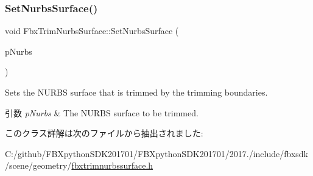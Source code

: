 \subsubsection{\texorpdfstring{Set\+Nurbs\+Surface()}{SetNurbsSurface()}}
{\footnotesize\ttfamily void Fbx\+Trim\+Nurbs\+Surface\+::\+Set\+Nurbs\+Surface (\begin{DoxyParamCaption}\item[{const \hyperlink{class_fbx_nurbs_surface}{Fbx\+Nurbs\+Surface} $\ast$}]{p\+Nurbs }\end{DoxyParamCaption})}

Sets the N\+U\+R\+BS surface that is trimmed by the trimming boundaries. 
\begin{DoxyParams}{引数}
{\em p\+Nurbs} & The N\+U\+R\+BS surface to be trimmed. \\
\hline
\end{DoxyParams}


このクラス詳解は次のファイルから抽出されました\+:\begin{DoxyCompactItemize}
\item 
C\+:/github/\+F\+B\+Xpython\+S\+D\+K201701/\+F\+B\+Xpython\+S\+D\+K201701/2017./include/fbxsdk/scene/geometry/\hyperlink{fbxtrimnurbssurface_8h}{fbxtrimnurbssurface.\+h}\end{DoxyCompactItemize}
